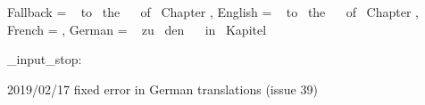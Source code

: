  {
  Fallback =  ~
             to~ the~  ~
             of~ Chapter \nobreakspace \ExerciseChapter ,
  English  =  ~
             to~ the~  ~
             of~ Chapter \nobreakspace \ExerciseChapter ,
  French   =  ,
  German   =  ~
             zu~ den~  ~
             in~ Kapitel \nobreakspace \ExerciseChapter
}

\file_input_stop:

2019/02/17 fixed error in German translations (issue 39)
